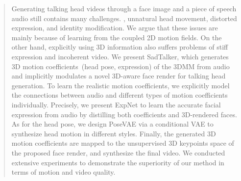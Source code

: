 \begin{abstract}
Generating talking head videos through a face image and a piece of speech audio still contains many challenges. \ie, unnatural head movement, distorted expression, and identity modification. We argue that these issues are mainly because of learning from the coupled 2D motion fields. On the other hand, explicitly using 3D information also suffers problems of stiff expression and incoherent video.
We present SadTalker, which generates 3D motion coefficients~(head pose, expression) of the 3DMM from audio and implicitly modulates a novel 3D-aware face render for talking head generation.
To learn the realistic motion coefficients, we explicitly model the connections between audio and different types of motion coefficients individually. Precisely, we present ExpNet to learn the accurate facial expression from audio by distilling both coefficients and 3D-rendered faces. 
As for the head pose, we design PoseVAE via a conditional VAE to synthesize head motion in different styles. 
Finally, the generated 3D motion coefficients are mapped to the unsupervised 3D keypoints space of the proposed face render, and synthesize the final video.
We conducted extensive experiments to demonstrate the superiority of our method in terms of motion and video quality.

\end{abstract}

